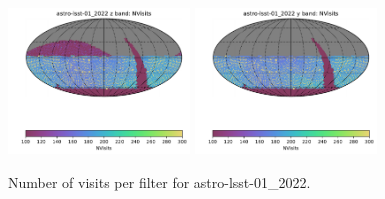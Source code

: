\documentclass[DM,lsstdraft,authoryear,toc]{lsstdoc}
\begin{document}
\begin{figure}[ht]
\includegraphics[width=0.43\textwidth]{figures/astro-lsst-01_2022_NVisits_z_band_HEAL_SkyMap}
\includegraphics[width=0.43\textwidth]{figures/astro-lsst-01_2022_NVisits_y_band_HEAL_SkyMap}
\caption{Number of visits per filter for astro-lsst-01\_2022.
\label{fig:baseline_nvisits}}
\end{figure}
\end{document}
